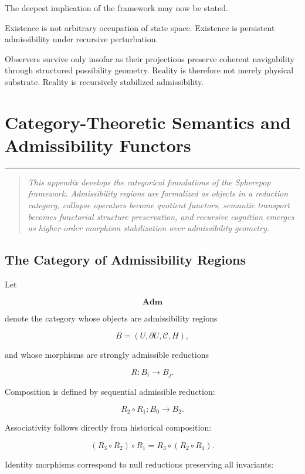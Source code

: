 \documentclass[12pt,openany]{book}
\theoremstyle{plain}
\theoremstyle{definition}
\theoremstyle{remark}
\newcommand{\chapterrule}{%
  \vspace{4pt}%
  {\color{SpherepopBlue}\rule{\textwidth}{0.8pt}}%
  \vspace{10pt}%
}
\newenvironment{chapterprecis}{%
  \begin{quote}\small\itshape}{%
  \end{quote}\medskip}
\begin{document}
The deepest implication of the framework may now be stated.

Existence is not arbitrary occupation of state space. Existence is persistent admissibility under recursive
perturbation.

Observers survive only insofar as their projections preserve
coherent navigability through structured possibility geometry. Reality is therefore not merely physical substrate. Reality is recursively stabilized admissibility.


\chapter{Category-Theoretic Semantics and Admissibility Functors}
\chapterrule

\begin{chapterprecis}
This appendix develops the categorical foundations of the
Spherepop framework. Admissibility regions are formalized as
objects in a reduction category, collapse operators become
quotient functors, semantic transport becomes functorial
structure preservation, and recursive cognition emerges as
higher-order morphism stabilization over admissibility geometry.
\end{chapterprecis}

\section{The Category of Admissibility Regions}

Let

\[
\mathbf{Adm}
\]

denote the category whose objects are admissibility regions

\[
B=(U,\partial U,\mathcal{C},H),
\]

and whose morphisms are strongly admissible reductions

\[
R :
B_i \to B_j.
\]

Composition is defined by sequential admissible reduction:

\[
R_2\circ R_1 :
B_0 \to B_2.
\]

Associativity follows directly from historical composition:

\[
(R_3\circ R_2)\circ R_1
=
R_3\circ(R_2\circ R_1).
\]

Identity morphisms correspond to null reductions preserving all
invariants:
\end{document}
